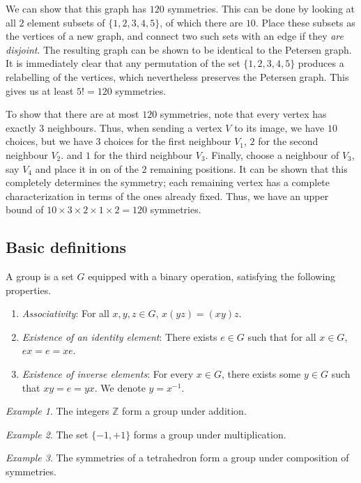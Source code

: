 \documentclass[11pt]{article}
\newcommand{\Z}{\mathbb{Z}}
\theoremstyle{definition}
\theoremstyle{remark}
\newtheorem*{example}{Example}
\numberwithin{equation}{section}
\begin{document}
    We can show that this graph has $120$ symmetries. This can be done by looking at
    all $2$ element subsets of $\{1, 2, 3, 4, 5\}$, of which there are $10$. Place
    these subsets as the vertices of a new graph, and connect two such sets with an
    edge if they \emph{are disjoint}. The resulting graph can be shown to be
    identical to the Petersen graph. It is immediately clear that any permutation of
    the set $\{1, 2, 3, 4, 5\}$ produces a relabelling of the vertices, which
    nevertheless preserves the Petersen graph. This gives us at least $5! = 120$
    symmetries.

    To show that there are at most $120$ symmetries, note that every vertex has
    exactly 3 neighbours. Thus, when sending a vertex $V$ to its image, we have $10$
    choices, but we have $3$ choices for the first neighbour $V_1$, $2$ for the
    second neighbour $V_2$. and $1$ for the third neighbour $V_3$. Finally, choose a
    neighbour of $V_3$, say $V_4$ and place it in on of the $2$ remaining positions.
    It can be shown that this completely determines the symmetry; each remaining
    vertex has a complete characterization in terms of the ones already fixed. Thus,
    we have an upper bound of $10 \times 3 \times 2 \times 1 \times 2 = 120$
    symmetries.
    

    \subsection{Basic definitions}
    \begin{definition}
        A group is a set $G$ equipped with a binary operation, satisfying the
        following properties.
        \begin{enumerate}
        \itemsep0em
            \item \emph{Associativity}: For all $x, y, z \in G$, $x(yz) = (xy)z$.
            \item \emph{Existence of an identity element}: There exists $e \in G$
            such that for all $x \in G$, $ex = e = xe$.
            \item \emph{Existence of inverse elements}: For every $x \in G$, there
            exists some $y \in G$ such that $xy = e = yx$. We denote $y = x^{-1}$.
        \end{enumerate}
    \end{definition}
    \begin{example}
        The integers $\Z$ form a group under addition.
    \end{example}
    \begin{example}
        The set $\{-1, +1\}$ forms a group under multiplication.
    \end{example}
    \begin{example}
        The symmetries of a tetrahedron form a group under composition of symmetries.
    \end{example}
\end{document}
